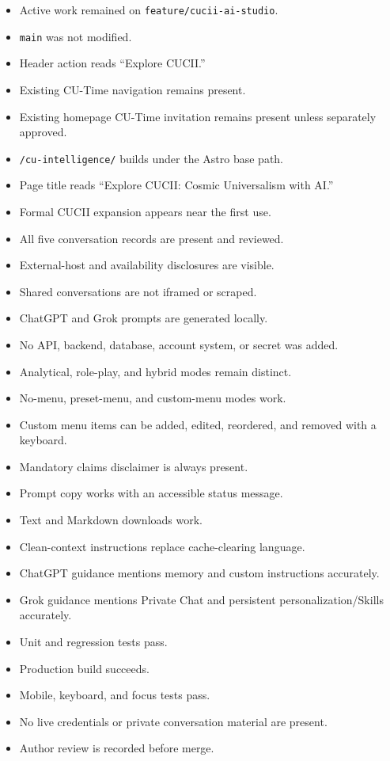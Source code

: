 \documentclass[11pt,letterpaper]{article}
\newcommand{\checkbox}{\(\square\)}
\newcommand{\branchname}[1]{\texttt{#1}}
\begin{document}
\begin{itemize}
    \item[\checkbox] Active work remained on \branchname{feature/cucii-ai-studio}.
    \item[\checkbox] \branchname{main} was not modified.
    \item[\checkbox] Header action reads ``Explore CUCII.''
    \item[\checkbox] Existing CU-Time navigation remains present.
    \item[\checkbox] Existing homepage CU-Time invitation remains present unless separately approved.
    \item[\checkbox] \texttt{/cu-intelligence/} builds under the Astro base path.
    \item[\checkbox] Page title reads ``Explore CUCII: Cosmic Universalism with AI.''
    \item[\checkbox] Formal CUCII expansion appears near the first use.
    \item[\checkbox] All five conversation records are present and reviewed.
    \item[\checkbox] External-host and availability disclosures are visible.
    \item[\checkbox] Shared conversations are not iframed or scraped.
    \item[\checkbox] ChatGPT and Grok prompts are generated locally.
    \item[\checkbox] No API, backend, database, account system, or secret was added.
    \item[\checkbox] Analytical, role-play, and hybrid modes remain distinct.
    \item[\checkbox] No-menu, preset-menu, and custom-menu modes work.
    \item[\checkbox] Custom menu items can be added, edited, reordered, and removed with a keyboard.
    \item[\checkbox] Mandatory claims disclaimer is always present.
    \item[\checkbox] Prompt copy works with an accessible status message.
    \item[\checkbox] Text and Markdown downloads work.
    \item[\checkbox] Clean-context instructions replace cache-clearing language.
    \item[\checkbox] ChatGPT guidance mentions memory and custom instructions accurately.
    \item[\checkbox] Grok guidance mentions Private Chat and persistent personalization/Skills accurately.
    \item[\checkbox] Unit and regression tests pass.
    \item[\checkbox] Production build succeeds.
    \item[\checkbox] Mobile, keyboard, and focus tests pass.
    \item[\checkbox] No live credentials or private conversation material are present.
    \item[\checkbox] Author review is recorded before merge.
\end{itemize}
\end{document}
